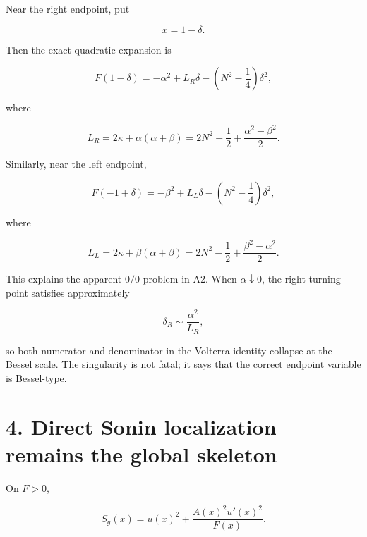 \documentclass[11pt]{article}
\begin{document}
Near the right endpoint, put

\begin{equation*}
x=1-\delta.
\end{equation*}


Then the exact quadratic expansion is

\begin{equation*}
\boxed{
F(1-\delta)
=
-\alpha^2
+
L_R\delta
-
\left(N^2-\frac14\right)\delta^2,
}
\tag{7}
\end{equation*}


where

\begin{equation*}
\boxed{
L_R=2\kappa+\alpha(\alpha+\beta)
=
2N^2-\frac12+\frac{\alpha^2-\beta^2}{2}.
}
\tag{8}
\end{equation*}


Similarly, near the left endpoint,

\begin{equation*}
\boxed{
F(-1+\delta)
=
-\beta^2
+
L_L\delta
-
\left(N^2-\frac14\right)\delta^2,
}
\tag{9}
\end{equation*}


where

\begin{equation*}
\boxed{
L_L=2\kappa+\beta(\alpha+\beta)
=
2N^2-\frac12+\frac{\beta^2-\alpha^2}{2}.
}
\tag{10}
\end{equation*}


This explains the apparent \(0/0\) problem in A2. When \(\alpha\downarrow0\), the right turning point satisfies approximately

\begin{equation*}
\delta_R\sim \frac{\alpha^2}{L_R},
\end{equation*}


so both numerator and denominator in the Volterra identity collapse at the Bessel scale. The singularity is not fatal; it says that the correct endpoint variable is Bessel-type.



\section*{4. Direct Sonin localization remains the global skeleton}

On \(F>0\),

\begin{equation*}
\boxed{
S_g(x)=u(x)^2+\frac{A(x)^2u'(x)^2}{F(x)}.
}
\tag{11}
\end{equation*}
\end{document}
